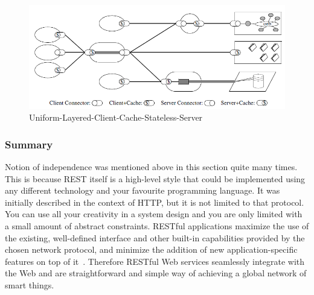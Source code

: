 \begin{center}
 \begin{figure}[h]
	\includegraphics[width=\textwidth]{../images/background/Uniform-Layered-Client-Cache-Stateless-Server.png}
	\caption{Uniform-Layered-Client-Cache-Stateless-Server ~\cite{Fielding2000} }
	\label{fig:Uniform-Layered-Client-Cache-Stateless-Server}
 \end{figure}
\end{center}

\subsubsection{Summary}
Notion of independence was mentioned above in this section quite many times.
This is because REST itself is a high-level style that could be implemented
using any different technology and your favourite programming language. It was initially described in the context
of HTTP, but it is not limited to that protocol. 
You can use all your creativity in a system design and you are only limited with a small amount of abstract constraints. 
 RESTful applications maximize the use of the existing, well-defined interface
and other built-in capabilities provided by the chosen network protocol,
and minimize the addition of new application-specific features on top of
it~\cite{rest_brief_intro}. Therefore RESTful Web services seamlessly integrate with the
Web and are straightforward and simple way of achieving a global network of
smart things.

